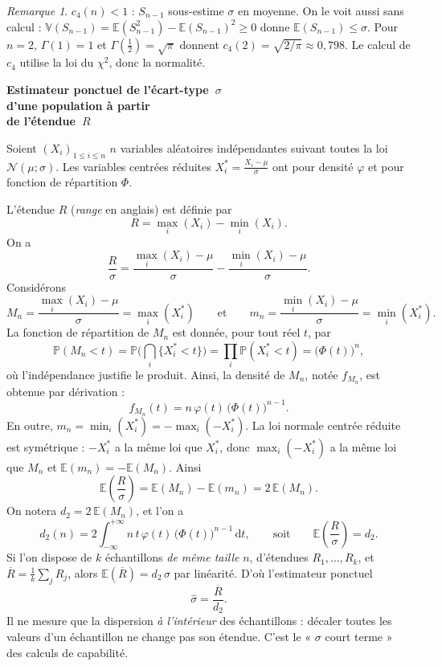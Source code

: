 \documentclass[11pt,a4paper]{article}
\theoremstyle{sj}
\theoremstyle{remark}
\newtheorem*{rem}{Remarque}
\newcommand{\E}{\mathbb{E}}
\newcommand{\V}{\mathbb{V}}
\renewcommand{\P}{\mathbb{P}}
\newcommand{\N}{\mathcal{N}}
\newcommand{\dd}{\,\mathrm{d}}
\begin{document}
\begin{rem}
$c_4(n)<1$ : $S_{n-1}$ sous-estime $\sigma$ en moyenne. On le voit aussi sans calcul : $\V(S_{n-1})=\E(S_{n-1}^2)-\E(S_{n-1})^2\ge0$ donne $\E(S_{n-1})\le\sigma$. Pour $n=2$, $\Gamma(1)=1$ et $\Gamma(\frac12)=\sqrt\pi$ donnent $c_4(2)=\sqrt{2/\pi}\approx0{,}798$. Le calcul de $c_4$ utilise la loi du $\chi^2$, donc la normalité.
\end{rem}

\newpage
{\raggedright\Huge\bfseries Estimateur ponctuel de l'écart-type~$\sigma$\\[4pt] d'une population à partir\\[4pt] de l'étendue~$R$\par}

\bigskip
Soient $(X_i)_{1\le i\le n}$ $n$ variables aléatoires indépendantes suivant toutes la loi $\N(\mu;\sigma)$. Les variables centrées réduites $X_i^*=\frac{X_i-\mu}{\sigma}$ ont pour densité $\varphi$ et pour fonction de répartition $\Phi$.

L'étendue $R$ (\emph{range} en anglais) est définie par
\[
R=\max_i(X_i)-\min_i(X_i).
\]
On a
\[
\frac{R}{\sigma}=\frac{\max_i(X_i)-\mu}{\sigma}-\frac{\min_i(X_i)-\mu}{\sigma}.
\]
Considérons
\[
M_n=\frac{\max_i(X_i)-\mu}{\sigma}=\max_i(X_i^*)\qquad\text{et}\qquad m_n=\frac{\min_i(X_i)-\mu}{\sigma}=\min_i(X_i^*).
\]
La fonction de répartition de $M_n$ est donnée, pour tout réel $t$, par
\[
\P(M_n<t)=\P\Big(\bigcap_i\{X_i^*<t\}\Big)=\prod_i\P(X_i^*<t)=\big(\Phi(t)\big)^n ,
\]
où l'indépendance justifie le produit. Ainsi, la densité de $M_n$, notée $f_{M_n}$, est obtenue par dérivation :
\[
f_{M_n}(t)=n\,\varphi(t)\,\big(\Phi(t)\big)^{n-1}.
\]
En outre, $m_n=\min_i(X_i^*)=-\max_i(-X_i^*)$. La loi normale centrée réduite est symétrique : $-X_i^*$ a la même loi que $X_i^*$, donc $\max_i(-X_i^*)$ a la même loi que $M_n$ et $\E(m_n)=-\E(M_n)$. Ainsi
\[
\E\left(\frac R\sigma\right)=\E(M_n)-\E(m_n)=2\,\E(M_n).
\]
On notera $d_2=2\,\E(M_n)$, et l'on a
\[
d_2(n)=2\int_{-\infty}^{+\infty}n\,t\,\varphi(t)\,\big(\Phi(t)\big)^{n-1}\dd t,
\qquad\text{soit}\qquad \E\left(\frac R\sigma\right)=d_2 .
\]
Si l'on dispose de $k$ échantillons \emph{de même taille} $n$, d'étendues $R_1,\dots,R_k$, et $\overline R=\frac1k\sum_jR_j$, alors $\E(\overline R)=d_2\,\sigma$ par linéarité. D'où l'estimateur ponctuel
\[
\hat\sigma=\frac{\overline R}{d_2}.
\]
Il ne mesure que la dispersion \emph{à l'intérieur} des échantillons : décaler toutes les valeurs d'un échantillon ne change pas son étendue. C'est le « $\sigma$ court terme » des calculs de capabilité.
\end{document}

